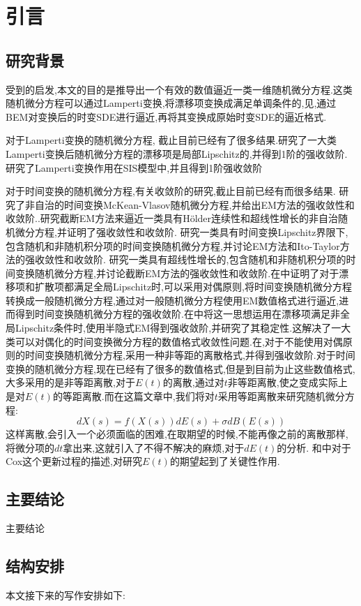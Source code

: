 

\chapter{引言}\label{chap:Intro}

\section{研究背景}\label{sec:background}

受到\cite{Alfonsi2013602}的启发,本文的目的是推导出一个有效的数值逼近一类一维随机微分方程.这类随机微分方程可以通过Lamperti变换,将漂移项变换成满足单调条件的,见\cite{iacus2008simulation},通过BEM对变换后的时变SDE进行逼近,再将其变换成原始时变SDE的逼近格式.

对于Lamperti变换的随机微分方程, 截止目前已经有了很多结果.\cite{neuenkirch2014first}研究了一大类Lamperti变换后随机微分方程的漂移项是局部Lipschitz的,并得到1阶的强收敛阶. \cite{yang2021first}研究了Lamperti变换作用在SIS模型中,并且得到1阶强收敛阶

对于时间变换的随机微分方程,有关收敛阶的研究,截止目前已经有而很多结果.\cite{wen2023strong}
研究了非自治的时间变换McKean-Vlasov随机微分方程,并给出EM方法的强收敛性和收敛阶.\cite{liu2020truncated}.研究截断EM方法来逼近一类具有Hölder连续性和超线性增长的非自治随机微分方程,并证明了强收敛性和收敛阶.\cite{jin2021strong}
研究一类具有时间变换Lipschitz界限下,包含随机和非随机积分项的时间变换随机微分方程,并讨论EM方法和Ito-Taylor方法的强收敛性和收敛阶.\cite{li2023convergence}
研究一类具有超线性增长的,包含随机和非随机积分项的时间变换随机微分方程,并讨论截断EM方法的强收敛性和收敛阶.在\cite{jum2014strong}中证明了对于漂移项和扩散项都满足全局Lipschitz时,可以采用对偶原则,将时间变换随机微分方程转换成一般随机微分方程,通过对一般随机微分方程使用EM数值格式进行逼近,进而得到时间变换随机微分方程的强收敛阶.在\cite{deng2020semi}中将这一思想运用在漂移项满足非全局Lipschitz条件时,使用半隐式EM得到强收敛阶,并研究了其稳定性.这解决了一大类可以对偶化的时间变换微分方程的数值格式收敛性问题.在\cite{jin2019strong},对于不能使用对偶原则的时间变换随机微分方程,采用一种非等距的离散格式,并得到强收敛阶.对于时间变换的随机微分方程,现在已经有了很多的数值格式,但是到目前为止这些数值格式,大多采用的是非等距离散,对于$E(t)$的离散,通过对$t$非等距离散,使之变成实际上是对$E(t)$的等距离散.而在这篇文章中,我们将对$t$采用等距离散来研究随机微分方程:
\begin{equation}\label{basic SDE}
	dX(s)=f(X(s))dE(s)+\sigma dB(E(s))
\end{equation}
这样离散,会引入一个必须面临的困难,在取期望的时候,不能再像之前的离散那样,将微分项的$dt$拿出来,这就引入了不得不解决的麻烦,对于$dE(t)$的分析.
\cite{daley2003introduction}和\cite{magdziarz2009stochastic}中对于Cox这个更新过程的描述,对研究$E(t)$的期望起到了关键性作用.


\section{主要结论}\label{sec:mainResults}

主要结论


\section{结构安排}

本文接下来的写作安排如下:


